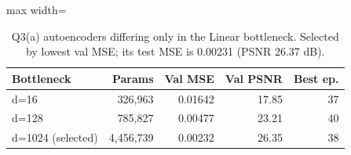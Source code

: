 \begin{table}[t]
\centering
\footnotesize
\setlength{\tabcolsep}{3.5pt}
\begin{adjustbox}{max width=\linewidth}
\begin{tabular}{lrrrr}
\toprule
Bottleneck & Params & Val MSE & Val PSNR & Best ep. \\
\midrule
d=16 & 326,963 & 0.01642 & 17.85 & 37 \\
d=128 & 785,827 & 0.00477 & 23.21 & 40 \\
d=1024 (selected) & 4,456,739 & 0.00232 & 26.35 & 38 \\
\bottomrule
\end{tabular}
\end{adjustbox}
\caption{Q3(a) autoencoders differing only in the Linear bottleneck. Selected by lowest val MSE; its test MSE is 0.00231 (PSNR 26.37 dB).}
\label{tab:q3a}
\end{table}
